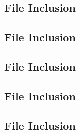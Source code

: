 \documentclass[11pt]{article}
\newcommand{\Verilog}[2][]{%
	
}
\begin{document}
\subsection*{File Inclusion}
\Verilog[caption=6-bit BCD Verilog code,label=code:file_ex]{bcd6.sv}

\subsection*{File Inclusion}
\Verilog[caption=6-bit BCD Test Benches Verilog code,label=code:file_ex]{bcd6_test.sv}


\subsection*{File Inclusion}
\Verilog[caption=11-bit BCD Verilog code,label=code:file_ex]{bcd11.sv}

\subsection*{File Inclusion}
\Verilog[caption=11-bit BCD Test Benches Verilog code,label=code:file_ex]{bcd11_test.sv}

\subsection*{File Inclusion}
\Verilog[caption=sseg1 BCD Verilog code,label=code:file_ex]{sseg1_BCD.sv}
\end{document}

